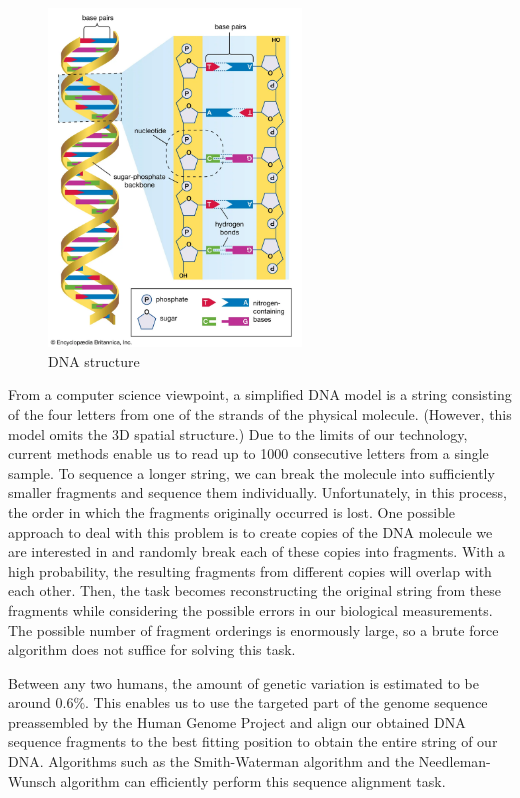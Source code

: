 \begin{figure}[H]
    \centering
    \includegraphics[width=0.6\textwidth]{figures/bioinformatics/dna.png}
    \caption{DNA structure\cite{dna_sequencing}}
\end{figure}

From a computer science viewpoint, a simplified DNA model is a string consisting of the four letters from one of the strands of the physical molecule. (However, this model omits the 3D spatial structure.) Due to the limits of our technology, current methods enable us to read up to 1000 consecutive letters from a single sample. To sequence a longer string, we can break the molecule into sufficiently smaller fragments and sequence them individually. Unfortunately, in this process, the order in which the fragments originally occurred is lost. One possible approach to deal with this problem is to create copies of the DNA molecule we are interested in and randomly break each of these copies into fragments. With a high probability, the resulting fragments from different copies will overlap with each other. Then, the task becomes reconstructing the original string from these fragments while considering the possible errors in our biological measurements. The possible number of fragment orderings is enormously large, so a brute force algorithm does not suffice for solving this task.\cite{CollinsHumanGenome1995}

Between any two humans, the amount of genetic variation is estimated to be around 0.6\%\cite{the_1000_genomes_project_consortium_global_2015}. This enables us to use the targeted part of the genome sequence preassembled by the Human Genome Project and align our obtained DNA sequence fragments to the best fitting position to obtain the entire string of our DNA. Algorithms such as the Smith-Waterman algorithm and the Needleman-Wunsch algorithm can efficiently perform this sequence alignment task.

